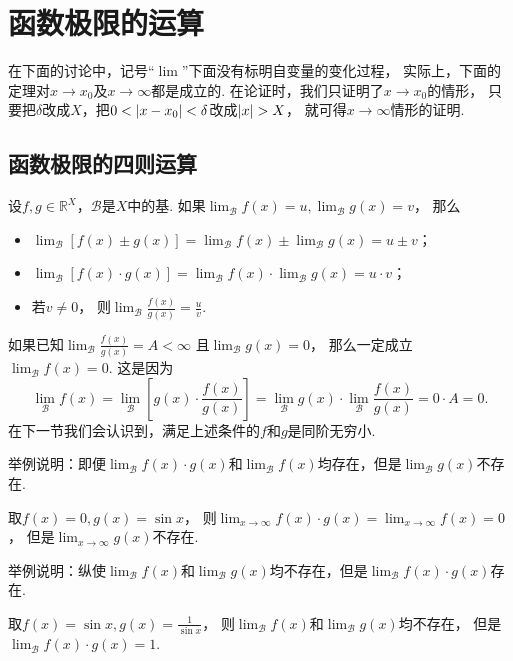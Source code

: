 \section{函数极限的运算}
在下面的讨论中，记号“\(\lim\)”下面没有标明自变量的变化过程，
实际上，下面的定理对\(x \to x_0\)及\(x \to \infty\)都是成立的.
在论证时，我们只证明了\(x \to x_0\)的情形，
只要把\(\delta\)改成\(X\)，把\(0<\abs{x-x_0}<\delta\)改成\(\abs{x}>X\)，
就可得\(x\to\infty\)情形的证明.

\subsection{函数极限的四则运算}
\begin{theorem}\label{theorem:极限.极限的四则运算法则}
设\(f,g\in\mathbb{R}^X\)，\(\mathcal{B}\)是\(X\)中的基.
如果\(\lim_\mathcal{B} f(x) = u,
\lim_\mathcal{B} g(x) = v\)，
那么\begin{itemize}
	\item \(\lim_\mathcal{B} [f(x) \pm g(x)]
	= \lim_\mathcal{B} f(x) \pm \lim_\mathcal{B} g(x)
	= u \pm v\)；

	\item \(\lim_\mathcal{B} [f(x) \cdot g(x)]
	= \lim_\mathcal{B} f(x) \cdot \lim_\mathcal{B} g(x)
	= u \cdot v\)；

	\item 若\(v\neq0\)，
	则\(\lim_\mathcal{B} \frac{f(x)}{g(x)} = \frac{u}{v}\).
\end{itemize}
\end{theorem}
\begin{remark}
如果已知\(\lim_\mathcal{B} \frac{f(x)}{g(x)} = A < \infty\)
且\(\lim_\mathcal{B} g(x) = 0\)，
那么一定成立\(\lim_\mathcal{B} f(x) = 0\).
这是因为\[
	\lim_\mathcal{B} f(x)
	= \lim_\mathcal{B} \left[
			g(x) \cdot \frac{f(x)}{g(x)}
		\right]
	= \lim_\mathcal{B} g(x) \cdot \lim_\mathcal{B} \frac{f(x)}{g(x)}
	= 0 \cdot A = 0.
\]
在下一节我们会认识到，满足上述条件的\(f\)和\(g\)是同阶无穷小.
\end{remark}
\begin{example}
举例说明：即便\(\lim_\mathcal{B} f(x) \cdot g(x)\)和\(\lim_\mathcal{B} f(x)\)均存在，但是\(\lim_\mathcal{B} g(x)\)不存在.
\begin{solution}
取\(f(x) = 0,
g(x) = \sin x\)，
则\(\lim_{x\to\infty} f(x) \cdot g(x)
= \lim_{x\to\infty} f(x)
= 0\)，
但是\(\lim_{x\to\infty} g(x)\)不存在.
\end{solution}
\end{example}
\begin{example}
举例说明：纵使\(\lim_\mathcal{B} f(x)\)和\(\lim_\mathcal{B} g(x)\)均不存在，但是\(\lim_\mathcal{B} f(x) \cdot g(x)\)存在.
\begin{solution}
取\(f(x) = \sin x,
g(x) = \frac1{\sin x}\)，
则\(\lim_\mathcal{B} f(x)\)和\(\lim_\mathcal{B} g(x)\)均不存在，
但是\(\lim_\mathcal{B} f(x) \cdot g(x) = 1\).
\end{solution}
\end{example}

